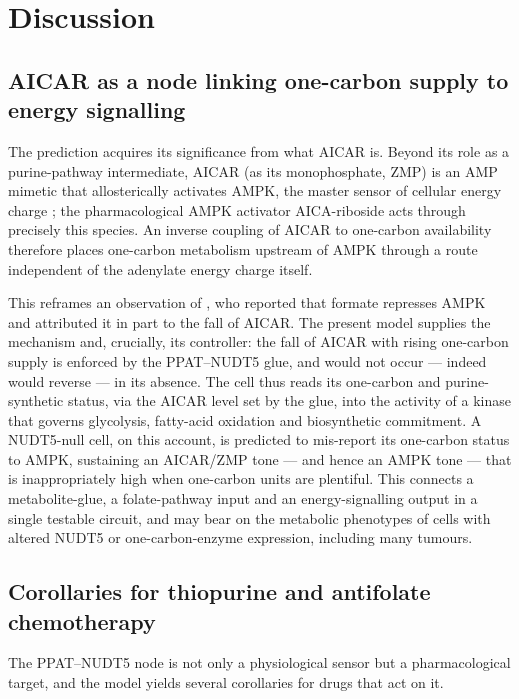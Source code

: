 \documentclass[a4paper,fleqn]{cas-sc}
\begin{document}
\section{Discussion}

\subsection{AICAR as a node linking one-carbon supply to energy signalling}
\label{sec:ampk}

The prediction acquires its significance from what AICAR is. Beyond its role as a
purine-pathway intermediate, AICAR (as its monophosphate, ZMP) is an AMP mimetic
that allosterically activates AMPK, the master sensor of cellular energy charge
\citep{corton1995,hardie2012}; the pharmacological AMPK activator AICA-riboside
acts through precisely this species. An inverse coupling of AICAR to one-carbon
availability therefore places one-carbon metabolism upstream of AMPK through a
route independent of the adenylate energy charge itself.

This reframes an observation of \citet{oizel2020}, who reported that formate
represses AMPK and attributed it in part to the fall of AICAR. The present model
supplies the mechanism and, crucially, its controller: the fall of AICAR with
rising one-carbon supply is enforced by the PPAT--NUDT5 glue, and would not occur
--- indeed would reverse --- in its absence. The cell thus reads its one-carbon and
purine-synthetic status, via the AICAR level set by the glue, into the activity
of a kinase that governs glycolysis, fatty-acid oxidation and biosynthetic
commitment. A NUDT5-null cell, on this account, is predicted to mis-report its
one-carbon status to AMPK, sustaining an AICAR/ZMP tone --- and hence an AMPK tone
--- that is inappropriately high when one-carbon units are plentiful. This connects
a metabolite-glue, a folate-pathway input and an energy-signalling output in a
single testable circuit, and may bear on the metabolic phenotypes of cells with
altered NUDT5 or one-carbon-enzyme expression, including many tumours.

\subsection{Corollaries for thiopurine and antifolate chemotherapy}
\label{sec:chemo}

The PPAT--NUDT5 node is not only a physiological sensor but a pharmacological
target, and the model yields several corollaries for drugs that act on it.
\end{document}
